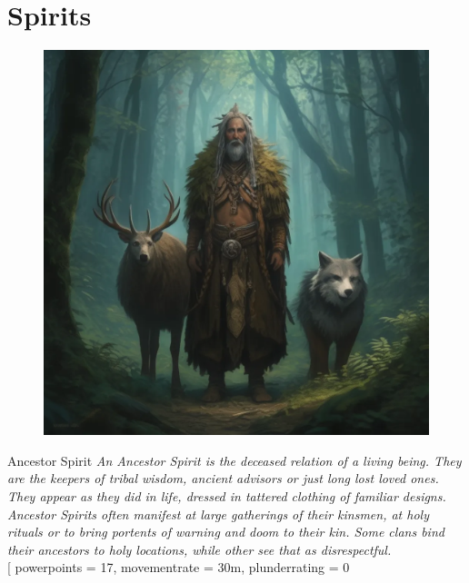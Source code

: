 \clearpage



\section{Spirits}
\label{sec:spirits}

\begin{samepage}

\begin{figure}[h]
\begin{center}
\includegraphics[scale=0.24]{img/ai-images/ancestor-spirit.png}
\end{center}
\end{figure}
\begin{monsterbox}{Ancestor Spirit}
	\textit{An Ancestor Spirit is the deceased relation of a living being. They are the keepers of tribal wisdom, ancient advisors or just long lost loved ones. They appear as they did in life, dressed in tattered clothing of familiar designs. Ancestor Spirits often manifest at large gatherings of their kinsmen, at holy rituals or to bring portents of warning and doom to their kin. Some clans bind their ancestors to holy locations, while other see that as disrespectful.}\\
	\rpghline
	\basics[%
	powerpoints = 17,
	movementrate = 30m,
	plunderrating = 0

\end{monsterbox}
\end{samepage}
